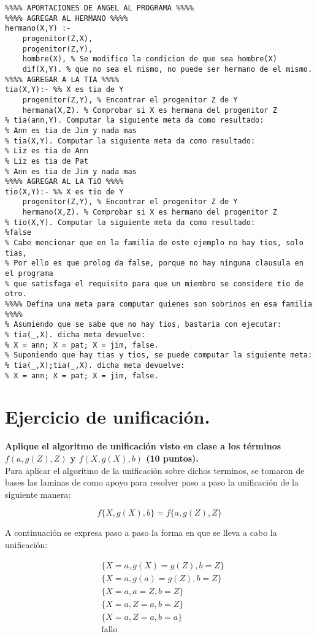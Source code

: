 \documentclass[11pt, letterpaper]{article}
\begin{document}
\begin{lstlisting}
%%%% APORTACIONES DE ANGEL AL PROGRAMA %%%%
%%%% AGREGAR AL HERMANO %%%%
hermano(X,Y) :-
    progenitor(Z,X),
    progenitor(Z,Y),
    hombre(X), % Se modifico la condicion de que sea hombre(X)
    dif(X,Y). % que no sea el mismo, no puede ser hermano de el mismo.
%%%% AGREGAR A LA TIA %%%%
tia(X,Y):- %% X es tia de Y
    progenitor(Z,Y), % Encontrar el progenitor Z de Y
    hermana(X,Z). % Comprobar si X es hermana del progenitor Z
% tia(ann,Y). Computar la siguiente meta da como resultado:
% Ann es tia de Jim y nada mas
% tia(X,Y). Computar la siguiente meta da como resultado:
% Liz es tia de Ann
% Liz es tia de Pat
% Ann es tia de Jim y nada mas
%%%% AGREGAR AL LA TiO %%%%
tio(X,Y):- %% X es tio de Y
    progenitor(Z,Y), % Encontrar el progenitor Z de Y
    hermano(X,Z). % Comprobar si X es hermano del progenitor Z
% tio(X,Y). Computar la siguiente meta da como resultado:
%false
% Cabe mencionar que en la familia de este ejemplo no hay tios, solo tias,
% Por ello es que prolog da false, porque no hay ninguna clausula en el programa
% que satisfaga el requisito para que un miembro se considere tio de otro.
%%%% Defina una meta para computar quienes son sobrinos en esa familia %%%%
% Asumiendo que se sabe que no hay tios, bastaria con ejecutar:
% tia(_,X). dicha meta devuelve:
% X = ann; X = pat; X = jim, false.
% Suponiendo que hay tias y tios, se puede computar la siguiente meta:
% tia(_,X);tia(_,X). dicha meta devuelve:
% X = ann; X = pat; X = jim, false.
\end{lstlisting}


\newpage

\section{Ejercicio de unificación.}

\textbf{Aplique el algoritmo de unificación visto en clase a los términos $f(a,g(Z),Z)$
y $f(X,g(X),b)$ (10 puntos).} \\

Para aplicar el algoritmo de la unificación sobre dichos terminos, se tomaron de bases las laminas de \cite{guerra2024} como apoyo para resolver paso a paso la unificación de la siguiente manera:


$$f\{X, g(X), b\} = f\{a, g(Z), Z\}$$

A continuación se expresa paso a paso la forma en que se lleva a cabo la unificación:

$$
\begin{aligned}
    &\{X = a, g(X) = g(Z), b = Z\} \\
    &\{X = a, g(a) = g(Z), b = Z\} \\
    &\{X = a, a = Z, b = Z\} \\
    &\{X = a, Z = a, b = Z\} \\
    &\{X = a, Z = a, b = a\} \\
    &\text{fallo}
\end{aligned}
$$
\end{document}
